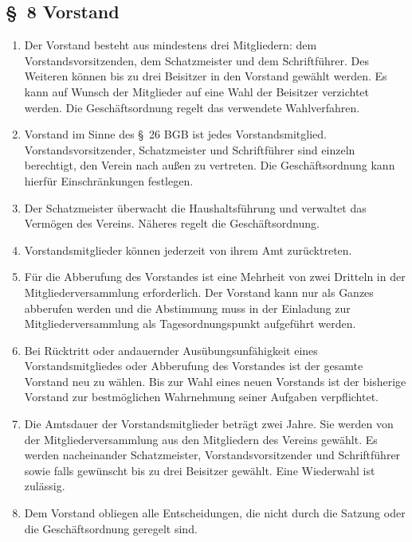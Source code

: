 \documentclass[10pt,a4paper]{scrartcl}
\begin{document}
\subsection*{\S \ 8 Vorstand }
\begin{enumerate}

    \item Der Vorstand besteht aus mindestens drei Mitgliedern: dem
    Vorstandsvorsitzenden, dem Schatzmeister und dem Schriftf{\"u}hrer. Des
    Weiteren k{\"o}nnen bis zu drei Beisitzer in den Vorstand gew{\"a}hlt werden. Es
    kann auf Wunsch der Mitglieder auf eine Wahl der Beisitzer verzichtet
    werden. Die Gesch{\"a}ftsordnung regelt das verwendete Wahlverfahren.
    \item Vorstand im Sinne des \S \ 26 BGB ist jedes Vorstandsmitglied.
    Vorstandsvorsitzender, Schatzmeister und Schriftf{\"u}hrer sind einzeln
    berechtigt, den Verein nach au{\ss}en zu vertreten. Die Gesch{\"a}ftsordnung kann
    hierf{\"u}r Einschr{\"a}nkungen festlegen.
	\item Der Schatzmeister {\"u}ber\-wacht die Haushaltsf{\"u}hrung und verwaltet das
		Ver\-m{\"o}\-gen des Vereins. N{\"a}\-her\-es regelt die Ge\-sch{\"a}fts\-ord\-nung.
	\item Vorstandsmitglieder k{\"o}nnen jederzeit von ihrem Amt zur{\"u}cktreten.
        \item F{\"u}r die Abberufung des Vorstandes ist eine Mehrheit von zwei Dritteln in der Mitgliederversammlung erforderlich. Der Vorstand kann nur als Ganzes abberufen werden und die Abstimmung muss in der Einladung zur Mitgliederversammlung als Tagesordnungspunkt aufgef{\"u}hrt werden.
        \item Bei R{\"u}cktritt oder andauernder Aus{\"u}bungsunf{\"a}higkeit eines Vorstandsmitgliedes oder Abberufung
		des Vorstandes ist der gesamte Vorstand neu zu w{\"a}hlen. Bis zur Wahl eines neuen Vorstands ist der
		bisherige Vorstand zur bestm{\"o}glichen Wahrnehmung seiner Aufgaben verpflichtet.
    \item Die Amtsdauer der Vorstandsmitglieder betr{\"a}gt zwei Jahre. Sie werden
    von der Mitgliederversammlung aus den Mitgliedern des Vereins gew{\"a}hlt. Es
    werden nacheinander Schatzmeister, Vorstandsvorsitzender und Schriftf{\"u}hrer
    sowie falls gew{\"u}nscht bis zu drei Beisitzer gew{\"a}hlt. Eine Wiederwahl ist
    zul{\"a}ssig.
    \item Dem Vorstand obliegen alle Entscheidungen, die nicht durch die Satzung oder die Gesch{\"a}ftsordnung geregelt sind.

\end{enumerate}
\end{document}
